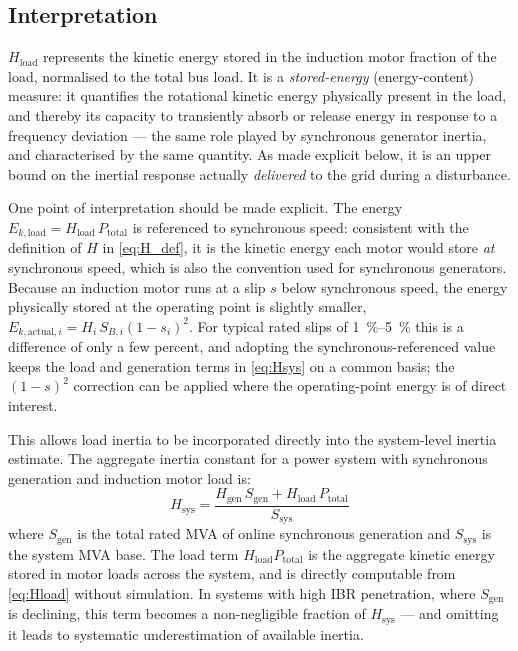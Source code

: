 \documentclass[journal]{IEEEtran}
\begin{document}
\subsection{Interpretation}

$H_{\mathrm{load}}$ represents the kinetic energy stored in the induction motor fraction of the load, normalised to the total bus load. It is a \emph{stored-energy} (energy-content) measure: it quantifies the rotational kinetic energy physically present in the load, and thereby its capacity to transiently absorb or release energy in response to a frequency deviation --- the same role played by synchronous generator inertia, and characterised by the same quantity. As made explicit below, it is an upper bound on the inertial response actually \emph{delivered} to the grid during a disturbance.

One point of interpretation should be made explicit. The energy $E_{k,\mathrm{load}} = H_{\mathrm{load}}\,P_{\mathrm{total}}$ is referenced to synchronous speed: consistent with the definition of $H$ in \eqref{eq:H_def}, it is the kinetic energy each motor would store \emph{at} synchronous speed, which is also the convention used for synchronous generators. Because an induction motor runs at a slip $s$ below synchronous speed, the energy physically stored at the operating point is slightly smaller, $E_{k,\mathrm{actual},i} = H_i\,S_{B,i}(1-s_i)^2$. For typical rated slips of \SIrange{1}{5}{\percent} this is a difference of only a few percent, and adopting the synchronous-referenced value keeps the load and generation terms in \eqref{eq:Hsys} on a common basis; the $(1-s)^2$ correction can be applied where the operating-point energy is of direct interest.

This allows load inertia to be incorporated directly into the system-level inertia estimate. The aggregate inertia constant for a power system with synchronous generation and induction motor load is:
\begin{equation}
    H_{\mathrm{sys}} = \frac{H_{\mathrm{gen}}\, S_{\mathrm{gen}} + H_{\mathrm{load}}\, P_{\mathrm{total}}}{S_{\mathrm{sys}}}
    \label{eq:Hsys}
\end{equation}
where $S_{\mathrm{gen}}$ is the total rated MVA of online synchronous generation and $S_{\mathrm{sys}}$ is the system MVA base. The load term $H_{\mathrm{load}} P_{\mathrm{total}}$ is the aggregate kinetic energy stored in motor loads across the system, and is directly computable from \eqref{eq:Hload} without simulation. In systems with high IBR penetration, where $S_{\mathrm{gen}}$ is declining, this term becomes a non-negligible fraction of $H_{\mathrm{sys}}$ --- and omitting it leads to systematic underestimation of available inertia.
\end{document}
